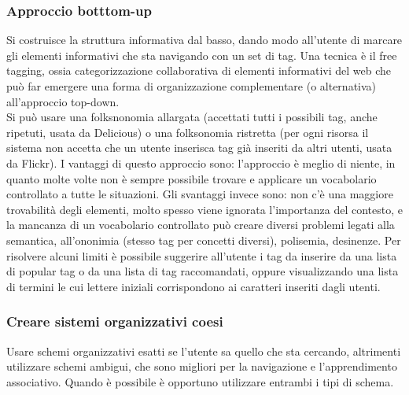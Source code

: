 \documentclass{article}
\begin{document}
\subsubsection{Approccio botttom-up}
Si costruisce la struttura informativa dal basso, dando modo all'utente di marcare gli elementi informativi che sta navigando con un set di tag. Una tecnica è il free tagging, ossia categorizzazione collaborativa di elementi informativi del web che può far emergere una forma di organizzazione complementare (o alternativa) all'approccio top-down.\\
Si può usare una folksnonomia allargata (accettati tutti i possibili tag, anche ripetuti, usata da Delicious) o una folksonomia ristretta (per ogni risorsa il sistema non accetta che un utente inserisca tag già inseriti da altri utenti, usata da Flickr).
I vantaggi di questo approccio sono: l'approccio è meglio di niente, in quanto molte volte non è sempre possibile trovare e applicare un vocabolario controllato a tutte le situazioni.
Gli svantaggi invece sono: non c'è una maggiore trovabilità degli elementi, molto spesso viene ignorata l'importanza del contesto, e la mancanza di un vocabolario controllato può creare diversi problemi legati alla semantica, all'ononimia (stesso tag per concetti diversi), polisemia, desinenze. Per risolvere alcuni limiti è possibile suggerire all'utente i tag da inserire da una lista di popular tag o da una lista di tag raccomandati, oppure visualizzando una lista di termini le cui lettere iniziali corrispondono ai caratteri inseriti dagli utenti.
\subsubsection{Creare sistemi organizzativi coesi}
Usare schemi organizzativi esatti se l'utente sa quello che sta cercando, altrimenti utilizzare schemi ambigui, che sono migliori per la navigazione e l'apprendimento associativo. Quando è possibile è opportuno utilizzare entrambi i tipi di schema.
\end{document}
